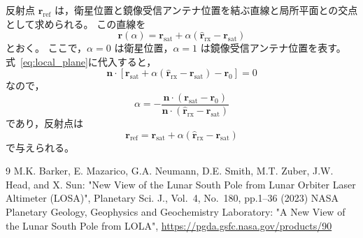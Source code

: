 \documentclass[11pt]{jarticle}
\begin{document}
反射点 $\mathbf{r}_{\mathrm{ref}}$ は，衛星位置と鏡像受信アンテナ位置を結ぶ直線と局所平面との交点として求められる。
この直線を
\begin{equation}
    \mathbf{r}(\alpha)
    =
    \mathbf{r}_{\mathrm{sat}}
    +
    \alpha
    \left(
    \hat{\mathbf{r}}_{\mathrm{rx}}
    -
    \mathbf{r}_{\mathrm{sat}}
    \right)
    \label{eq:sat_image_line}
\end{equation}
とおく。
ここで，$\alpha=0$ は衛星位置，$\alpha=1$ は鏡像受信アンテナ位置を表す。
式~\eqref{eq:local_plane}に代入すると，
\begin{equation}
\mathbf{n}\cdot\left[
\mathbf{r}_{\mathrm{sat}}+\alpha\left(\hat{\mathbf{r}}_{\mathrm{rx}} - \mathbf{r}_{\mathrm{sat}}\right)-\mathbf{r}_0
\right] = 0
\end{equation}
なので，
\begin{equation}
    \alpha
    =
    -
    \frac{
    \mathbf{n}\cdot
    \left(
    \mathbf{r}_{\mathrm{sat}}
    -
    \mathbf{r}_0
    \right)
    }
    {
    \mathbf{n}\cdot
    \left(
    \hat{\mathbf{r}}_{\mathrm{rx}}
    -
    \mathbf{r}_{\mathrm{sat}}
    \right)
    }
    \label{eq:reflection_parameter}
\end{equation}
であり，反射点は
\begin{equation}
    \mathbf{r}_{\mathrm{ref}}
    =
    \mathbf{r}_{\mathrm{sat}}
    +
    \alpha
    \left(
    \hat{\mathbf{r}}_{\mathrm{rx}}
    -
    \mathbf{r}_{\mathrm{sat}}
    \right)
    \label{eq:reflection_point}
\end{equation}
で与えられる。

\begin{thebibliography}{9}%
 M.K. Barker, E. Mazarico, G.A. Neumann, D.E. Smith, M.T. Zuber, J.W. Head, and X. Sun: "New View of the Lunar South Pole from Lunar Orbiter Laser Altimeter (LOSA)", Planetary Sci. J., Vol.~4, No.~180, pp.1--36 (2023)
 NASA Planetary Geology, Geophysics and Geochemistry Laboratory: "A New View of the Lunar South Pole from LOLA", \url{https://pgda.gsfc.nasa.gov/products/90}
\end{thebibliography}
\end{document}
